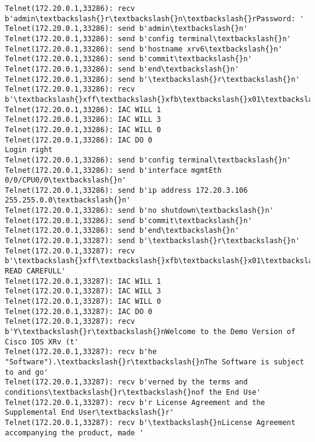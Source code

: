 \documentclass[11pt]{article}
\begin{document}
\begin{Verbatim}[commandchars=\\\{\}]
Telnet(172.20.0.1,33286): recv b'admin\textbackslash{}r\textbackslash{}n\textbackslash{}rPassword: '
Telnet(172.20.0.1,33286): send b'admin\textbackslash{}n'
Telnet(172.20.0.1,33286): send b'config terminal\textbackslash{}n'
Telnet(172.20.0.1,33286): send b'hostname xrv6\textbackslash{}n'
Telnet(172.20.0.1,33286): send b'commit\textbackslash{}n'
Telnet(172.20.0.1,33286): send b'end\textbackslash{}n'
Telnet(172.20.0.1,33286): send b'\textbackslash{}r\textbackslash{}n'
Telnet(172.20.0.1,33286): recv b'\textbackslash{}xff\textbackslash{}xfb\textbackslash{}x01\textbackslash{}xff\textbackslash{}xfb\textbackslash{}x03\textbackslash{}xff\textbackslash{}xfb\textbackslash{}x00\textbackslash{}xff\textbackslash{}xfd\textbackslash{}x00\textbackslash{}x1b]0;xrv6\textbackslash{}x07\textbackslash{}r\textbackslash{}n\textbackslash{}rRP/0/0/CPU0:xrv6\#\textbackslash{}r\textbackslash{}n\textbackslash{}rRP/0/0'
Telnet(172.20.0.1,33286): IAC WILL 1
Telnet(172.20.0.1,33286): IAC WILL 3
Telnet(172.20.0.1,33286): IAC WILL 0
Telnet(172.20.0.1,33286): IAC DO 0
Login right
Telnet(172.20.0.1,33286): send b'config terminal\textbackslash{}n'
Telnet(172.20.0.1,33286): send b'interface mgmtEth 0/0/CPU0/0\textbackslash{}n'
Telnet(172.20.0.1,33286): send b'ip address 172.20.3.106 255.255.0.0\textbackslash{}n'
Telnet(172.20.0.1,33286): send b'no shutdown\textbackslash{}n'
Telnet(172.20.0.1,33286): send b'commit\textbackslash{}n'
Telnet(172.20.0.1,33286): send b'end\textbackslash{}n'
Telnet(172.20.0.1,33287): send b'\textbackslash{}r\textbackslash{}n'
Telnet(172.20.0.1,33287): recv b'\textbackslash{}xff\textbackslash{}xfb\textbackslash{}x01\textbackslash{}xff\textbackslash{}xfb\textbackslash{}x03\textbackslash{}xff\textbackslash{}xfb\textbackslash{}x00\textbackslash{}xff\textbackslash{}xfd\textbackslash{}x00\textbackslash{}x1b]0;xrv7\textbackslash{}x07\textbackslash{}r\textbackslash{}n\textbackslash{}r\textbackslash{}nIMPORTANT:  READ CAREFULL'
Telnet(172.20.0.1,33287): IAC WILL 1
Telnet(172.20.0.1,33287): IAC WILL 3
Telnet(172.20.0.1,33287): IAC WILL 0
Telnet(172.20.0.1,33287): IAC DO 0
Telnet(172.20.0.1,33287): recv b'Y\textbackslash{}r\textbackslash{}nWelcome to the Demo Version of Cisco IOS XRv (t'
Telnet(172.20.0.1,33287): recv b'he "Software").\textbackslash{}r\textbackslash{}nThe Software is subject to and go'
Telnet(172.20.0.1,33287): recv b'verned by the terms and conditions\textbackslash{}r\textbackslash{}nof the End Use'
Telnet(172.20.0.1,33287): recv b'r License Agreement and the Supplemental End User\textbackslash{}r'
Telnet(172.20.0.1,33287): recv b'\textbackslash{}nLicense Agreement accompanying the product, made '

\end{Verbatim}
\end{document}
